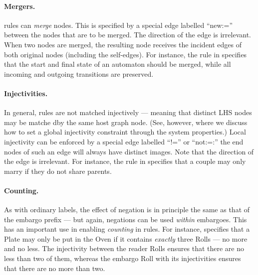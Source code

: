 \paragraph{Mergers.}

\Groove{} rules can \emph{merge} nodes. This is specified by a special edge
labelled ``\textsf{new:=}'' between the nodes that are to be merged. The
direction of the edge is irrelevant. When two nodes are merged, the resulting
node receives the incident edges of both original nodes (including the
self-edges). For instance, the rule in  specifies that the start
and final state of an automaton should be merged, while all incoming and
outgoing transitions are preserved.


\paragraph{Injectivities.}

In general, rules are not matched injectively --- meaning that distinct LHS
nodes may be matche dby the same host graph node. (See, however,
 where we discuss how to set a global injectivity
constraint through the system properties.) Local injectivity can be enforced by
a special edge labelled ``\textsf{!=}'' or ``\textsf{not:=}:'' the end nodes of
such an edge will always have distinct images. Note that the direction of the
edge is irrelevant. For instance, the rule in  specifies that
a couple may only marry if they do not share parents.


\paragraph{Counting.}

As with ordinary labels, the effect of negation is in principle the same as
that of the embargo prefix --- but again, negations can be used \emph{within}
embargoes. This has an important use in enabling \emph{counting} in rules. For
instance,  specifies that a \textsf{Plate} may only be put in
the \textsf{Oven} if it contains \emph{exactly} three \textsf{Roll}s --- no
more and no less. The injectivity between the reader \textsf{Roll}s ensures
that there are no less than two of them, whereas the embargo \textsf{Roll} with
its injectivities ensures that there are no more than two.

